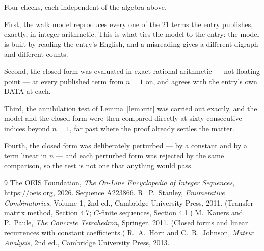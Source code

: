 \documentclass[11pt,a4paper]{article}
\theoremstyle{plain}
\theoremstyle{definition}
\begin{document}
Four checks, each independent of the algebra above.

First, the walk model reproduces every one of the $21$ terms the entry publishes,
exactly, in integer arithmetic. This is what ties the model to the entry: the model is built
by reading the entry's English, and a misreading gives a different digraph and different
counts.

Second, the closed form was evaluated in exact rational arithmetic --- not floating point ---
at every published term from $n=1$ on, and agrees with the entry's own DATA at each.

Third, the annihilation test of Lemma~\ref{lem:crit} was carried out exactly, and the model
and the closed form were then compared directly at sixty consecutive indices beyond
$n=1$, far past where the proof already settles the matter.

Fourth, the closed form was deliberately perturbed --- by a constant and by a term linear in
$n$ --- and each perturbed form was rejected by the same comparison, so the test is not one
that anything would pass.

\begin{thebibliography}{9}
 The OEIS Foundation, \emph{The On-Line Encyclopedia of Integer
Sequences}, \url{https://oeis.org}, 2026. Sequence A223866.
 R.~P.~Stanley, \emph{Enumerative Combinatorics}, Volume 1, 2nd ed.,
Cambridge University Press, 2011. (Transfer-matrix method, Section 4.7; $C$-finite sequences,
Section 4.1.)
 M.~Kauers and P.~Paule, \emph{The Concrete Tetrahedron}, Springer, 2011.
(Closed forms and linear recurrences with constant coefficients.)
 R.~A.~Horn and C.~R.~Johnson, \emph{Matrix Analysis}, 2nd ed., Cambridge
University Press, 2013.
\end{thebibliography}
\end{document}
